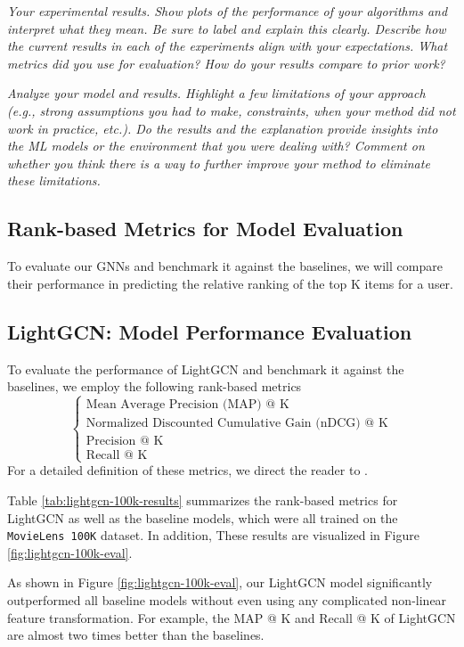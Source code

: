 \documentclass{article}
\begin{document}
\textit{Your experimental results. Show plots of the performance of your algorithms and interpret what they mean. Be sure to label and explain this clearly. Describe how the current results in each of the experiments align with your expectations. What metrics did you use for evaluation? How do your results compare to prior work?}

\textit{Analyze your model and results. Highlight a few limitations of your approach (e.g., strong assumptions you had to make, constraints, when your method did not work in practice, etc.). Do
the results and the explanation provide insights into the ML models or the environment that you were dealing with? Comment on whether you think there is a way to further improve your method to eliminate these limitations.}

\subsection{Rank-based Metrics for Model Evaluation}

To evaluate our GNNs and benchmark it against the baselines, we will compare their performance in predicting the relative ranking of the top K items for a user. 

\subsection{LightGCN: Model Performance Evaluation} \label{lightgcn-eval}

To evaluate the performance of LightGCN and benchmark it against the baselines, we employ the following rank-based metrics
$$
\begin{cases}
\text{Mean Average Precision (MAP) @ K} \\
\text{Normalized Discounted Cumulative Gain (nDCG) @ K} \\
\text{Precision @ K} \\
\text{Recall @ K}
\end{cases}
$$
For a detailed definition of these metrics, we direct the reader to \cite{metrics}.

Table \ref{tab:lightgcn-100k-results} summarizes the rank-based metrics for LightGCN as well as the baseline models, which were all trained on the \texttt{MovieLens 100K} dataset. In addition, These results are visualized in Figure \ref{fig:lightgcn-100k-eval}.

As shown in Figure \ref{fig:lightgcn-100k-eval}, our LightGCN model significantly outperformed all baseline models without even using any complicated non-linear feature transformation. For example, the MAP @ K and Recall @ K of LightGCN are almost two times better than the baselines.
\end{document}
